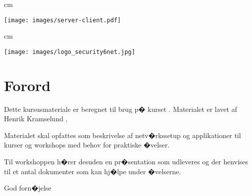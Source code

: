 \documentclass[a4paper,11pt,notitlepage]{oevelser}
\begin{document}

\newcommand{\emne}[1]{TCP/IP grundkursus}
\newcommand{\kursus}[1]{\emne{} workshop}
\newcommand{\kursusnavn}[1]{\emne\\ �velsesh�fte}


 cm

\begin{center}
\colorbox{white}{\texttt{[image: images/server-client.pdf]}}


 cm


\colorbox{white}{\texttt{[image: images/logo\_security6net.jpg]}}


\end{center}

\thispagestyle{empty}
\eject

\setlength{\parskip}{0pt}

\setcounter{tocdepth}{0}

\normal

{\color{titlecolor}\tableofcontents}

\normal
\pagestyle{fancyplain}
\chapter*{\color{titlecolor}Forord}
Dette kursusmateriale er beregnet til brug p� kurset
\emph{\kursus}. Materialet er lavet af Henrik Kramselund  , 

Materialet skal opfattes som beskrivelse af netv�rkssetup og
applikationer til kurser og workshops med behov for praktiske
�velser.

Til workshoppen h�rer desuden en pr�sentation som udleveres og der
henvises til et antal dokumenter som kan hj�lpe under �velserne.

\vskip 1cm
God forn�jelse
\end{document}
